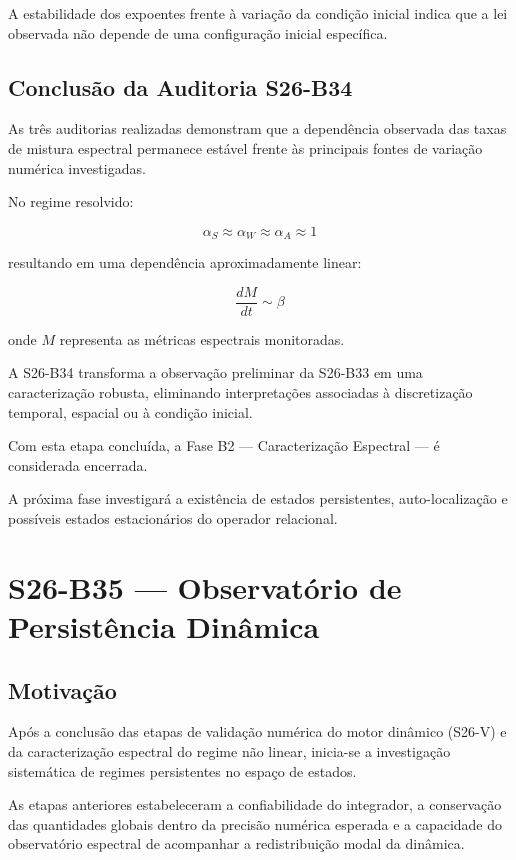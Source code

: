 \documentclass[11pt,a4paper]{article}
\begin{document}
A estabilidade dos expoentes frente à variação da condição inicial
indica que a lei observada não depende de uma configuração inicial
específica.


\subsection{Conclusão da Auditoria S26-B34}

As três auditorias realizadas demonstram que a dependência observada
das taxas de mistura espectral permanece estável frente às principais
fontes de variação numérica investigadas.

No regime resolvido:

\[
\alpha_S\approx\alpha_W\approx\alpha_A\approx1
\]

resultando em uma dependência aproximadamente linear:

\[
\frac{dM}{dt}\sim\beta
\]

onde $M$ representa as métricas espectrais monitoradas.

A S26-B34 transforma a observação preliminar da S26-B33 em uma
caracterização robusta, eliminando interpretações associadas à
discretização temporal, espacial ou à condição inicial.

Com esta etapa concluída, a Fase B2 — Caracterização Espectral —
é considerada encerrada.

A próxima fase investigará a existência de estados persistentes,
auto-localização e possíveis estados estacionários do operador
relacional.

\section{S26-B35 — Observatório de Persistência Dinâmica}

\subsection{Motivação}

Após a conclusão das etapas de validação numérica do motor dinâmico
(S26-V) e da caracterização espectral do regime não linear, inicia-se
a investigação sistemática de regimes persistentes no espaço de estados.

As etapas anteriores estabeleceram a confiabilidade do integrador,
a conservação das quantidades globais dentro da precisão numérica
esperada e a capacidade do observatório espectral de acompanhar a
redistribuição modal da dinâmica.
\end{document}
